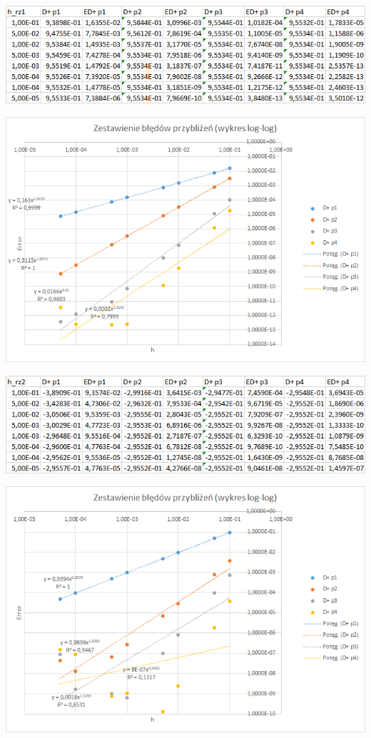 \includegraphics{Lab2/charts/rz1_log_Df_dane.png}

\includegraphics{Lab2/charts/rz1_log_Df.png}
\newpage


\includegraphics{Lab2/charts/rz2_log_Df_dane.png}

\includegraphics{Lab2/charts/rz2_log_Df.png}
\newpage


